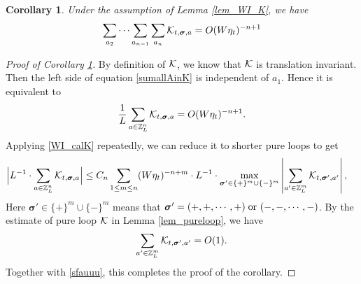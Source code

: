 \documentclass[10pt,reqno]{article}
\theoremstyle{plain} %
\newtheorem{corollary}[theorem]{Corollary}
\theoremstyle{remark}
\numberwithin{equation}{section}
\begin{document}
\begin{corollary}\label{lem_sumAinK}
    Under the assumption of Lemma \ref{lem_WI_K}, we have 
\begin{align}\label{sumallAinK}
      \sum_{a_2}\cdots\sum_{a_{n-1}}\sum_{a_n}{\cal K}_{t, \boldsymbol{\sigma}, \textbf{a}}=O(W\eta_t)^{-n+1}
\end{align}
 \end{corollary}
 


\begin{proof}[Proof of Corollary \ref{lem_sumAinK}]
By definition of $\cal K$, we know that ${\cal K}$ is  translation invariant. Then the left side  of equation \eqref{sumallAinK} is independent of $a_1$. 
Hence it is equivalent to 
$$
 \frac1L\sum_{\textbf{a}\in\mathbb Z_L^n}{\cal K}_{t, \boldsymbol{\sigma}, \textbf{a}}=O(W\eta_t)^{-n+1}.
$$
 Applying \eqref{WI_calK} repeatedly, we can reduce it to shorter pure loops to get  
\begin{align}\label{sfauuu}
 \Big | L^{-1}\cdot \sum_{\textbf{a}\in\mathbb Z_L^n}{\cal K}_{t, \boldsymbol{\sigma}, \textbf{a}}\Big |
  \le C_n \sum_{1\le m\le n}(W\eta_t)^{-n+m}\cdot L^{-1}\cdot
  \max_{\boldsymbol{\sigma}'\in \{+\}^m \cup \{-\}^m}\left| \sum_{\textbf{a}'\in\mathbb Z_L^m}{\cal K}_{t, \boldsymbol{\sigma}', \textbf{a}'}\right|,\quad 
\end{align}
Here $\boldsymbol{\sigma}'\in \{+\}^m \cup \{-\}^m$ means that $\boldsymbol{\sigma}'=(+,+,\cdots,+)\; \hbox{or }(-,-,\cdots,-)$.
By the estimate of pure loop $\cal K$  in   Lemma \ref{lem_pureloop}, we have 
$$
\sum_{\textbf{a}'\in\mathbb Z_L^m}{\cal K}_{t, \boldsymbol{\sigma}', \textbf{a}'}=O(1).
$$
Together with \eqref{sfauuu}, this  completes the proof of the corollary. 

\end{proof}



\bigskip
\end{document}
